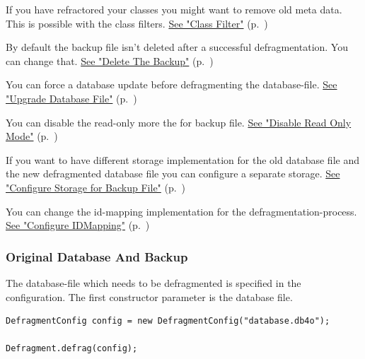 If you have refractored your classes you might want to remove old meta data. This is possible with the class filters. \hyperref[ref:advanced-topics-defragment-configuration-class-filter]{See "Class Filter"} (p.~\pageref{ref:advanced-topics-defragment-configuration-class-filter})

By default the backup file isn't deleted after a successful defragmentation. You can change that. \hyperref[ref:advanced-topics-defragment-configuration-delete-backup]{See "Delete The Backup"} (p.~\pageref{ref:advanced-topics-defragment-configuration-delete-backup})

You can force a database update before defragmenting the database-file. \hyperref[ref:advanced-topics-defragment-configuration-upgrade-db]{See "Upgrade Database File"} (p.~\pageref{ref:advanced-topics-defragment-configuration-upgrade-db})

You can disable the read-only more the for backup file. \hyperref[ref:advanced-topics-defragment-configuration-disable-read-only]{See "Disable Read Only Mode"} (p.~\pageref{ref:advanced-topics-defragment-configuration-disable-read-only})

If you want to have different storage implementation for the old database file and the new defragmented database file you can configure a separate storage. \hyperref[ref:advanced-topics-defragment-configuration-storage-backupdb]{See "Configure Storage for Backup File"} (p.~\pageref{ref:advanced-topics-defragment-configuration-storage-backupdb})

You can change the id-mapping implementation for the defragmentation-process. \hyperref[ref:advanced-topics-defragment-configuration-id-mapping]{See "Configure IDMapping"} (p.~\pageref{ref:advanced-topics-defragment-configuration-id-mapping})

\subsubsection{Original Database And Backup}
\label{ref:advanced-topics-defragment-configuration-database-files}

The database-file which needs to be defragmented is specified in the configuration. The first constructor parameter is the database file.

\begin{lstlisting}
DefragmentConfig config = new DefragmentConfig("database.db4o");

Defragment.defrag(config);
\end{lstlisting}


